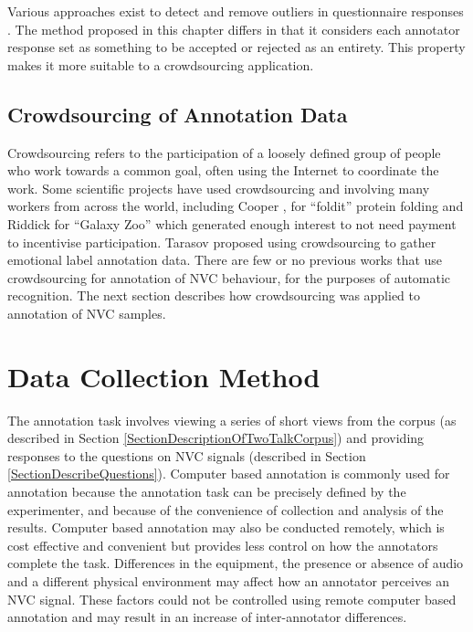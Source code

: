 Various approaches exist to detect and remove outliers in questionnaire responses \cite{Zijlstra2011}. The method proposed in this chapter differs in that it considers each annotator response set as something to be accepted or rejected as an entirety. This property makes it more suitable to a crowdsourcing application.


\subsection{Crowdsourcing of Annotation Data}

Crowdsourcing refers to the participation of a loosely defined group of people who work towards a common goal, often using the Internet to coordinate the work. Some scientific projects have used crowdsourcing and involving many workers from across the world, including Cooper \etal \cite{Cooper2010}, for ``foldit'' protein folding and Riddick \etal for ``Galaxy Zoo'' \cite{Raddick2010} which generated enough interest to not need payment to incentivise participation. Tarasov \etal \cite{Tarasov2010} proposed using crowdsourcing to gather emotional label annotation data. There are few or no previous works that use crowdsourcing for annotation of \ac{NVC} behaviour, for the purposes of automatic recognition. The next section describes how crowdsourcing was applied to annotation of \ac{NVC} samples.

\section{Data Collection Method}
\label{SectionCrowdSourceDataCollection}

The annotation task involves viewing a series of short views from the corpus (as described in Section \ref{SectionDescriptionOfTwoTalkCorpus}) and providing responses to the questions on \ac{NVC} signals (described in Section \ref{SectionDescribeQuestions}). Computer based annotation is commonly used for annotation because the annotation task can be precisely defined by the experimenter, and because of the convenience of collection and analysis of the results. Computer based annotation may also be conducted remotely, which is cost effective and convenient but provides less control on how the annotators complete the task. Differences in the equipment, the presence or absence of audio and a different physical environment may affect how an annotator perceives an \ac{NVC} signal. These factors could not be controlled using remote computer based annotation and may result in an increase of inter-annotator differences.

